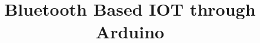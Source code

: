 \documentclass[journal,12pt,twocolumn]{IEEEtran}
\begin{document}






\def\putbox#1#2#3{\makebox[0in][l]{\makebox[#1][l]{}\raisebox{\baselineskip}[0in][0in]{\raisebox{#2}[0in][0in]{#3}}}}
     \def\rightbox#1{\makebox[0in][r]{#1}}
     \def\centbox#1{\makebox[0in]{#1}}
     \def\topbox#1{\raisebox{-\baselineskip}[0in][0in]{#1}}
     \def\midbox#1{\raisebox{-0.5\baselineskip}[0in][0in]{#1}}

\vspace{3cm}

\title{ Bluetooth Based IOT through Arduino
}


%
%
%
\end{document}
